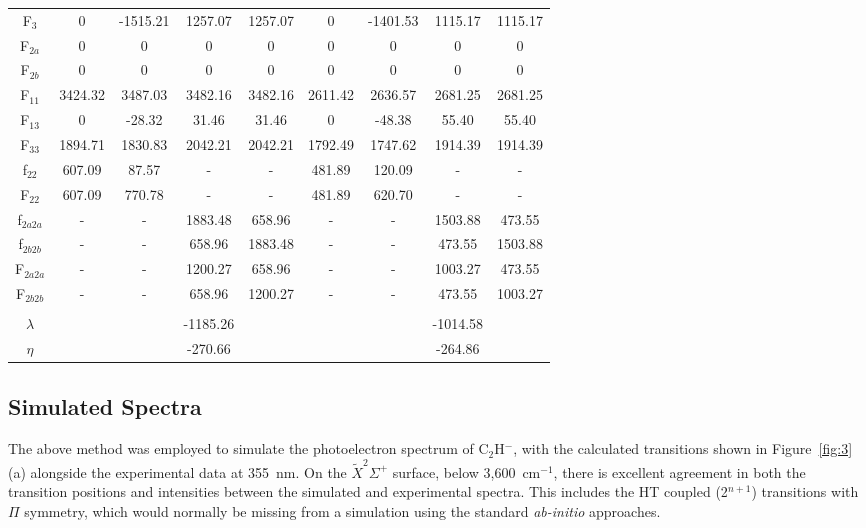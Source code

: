 \documentclass[journal=jpcafh,manuscript=article,layout=onecolumn, 12pt]{achemso}
\begin{document}
\begin{table}
\begin{tabular}{c | c c c c | c c c c}
     	F$_3$ &  0& -1515.21&  1257.07& 1257.07& 0& -1401.53& 1115.17& 1115.17\\
     	F$_{2a}$& 0 & 0& 0& 0& 0& 0& 0&0 \\
     	F$_{2b}$&  0& 0& 0& 0& 0& 0& 0&0 \\
     	F$_{11}$& 3424.32 &  3487.03& 3482.16& 3482.16& 2611.42&  2636.57& 2681.25& 2681.25\\
     	F$_{13}$&  0 & -28.32& 31.46& 31.46& 0& -48.38& 55.40& 55.40\\
     	F$_{33}$& 1894.71 & 1830.83& 2042.21& 2042.21& 1792.49&  1747.62& 1914.39& 1914.39\\
     	f$_{22}$& 607.09&  87.57& -& -& 481.89&  120.09& -& -\\
     	F$_{22}$& 607.09 & 770.78& -& -& 481.89& 620.70& -& -\\
     	f$_{2a2a}$& - &- & 1883.48& 658.96& -& -& 1503.88& 473.55\\
     	f$_{2b2b}$& - &- & 658.96& 1883.48& -& -& 473.55& 1503.88\\
     	F$_{2a2a}$& -& -& 1200.27& 658.96& -& -& 1003.27& 473.55\\
     	F$_{2b2b}$& -& -& 658.96& 1200.27& -& -& 473.55& 1003.27\\
     	&&&&&&&& \\
     	$\lambda$& & & -1185.26& & & & -1014.58& \\
     	$\eta$ & & & -270.66& & & & -264.86& \\
     	
     \end{tabular}
\end{table}

\subsection{Simulated Spectra}
The above method was employed to simulate the photoelectron spectrum of C$_2$H$^-$, with the calculated transitions shown in Figure~\ref{fig:3}(a) alongside the experimental data at 355~nm. %
On the $\tilde{X} ^2\Sigma^+$ surface, below 3,600~cm$^{-1}$, there is excellent agreement in both the transition positions and intensities between the simulated and experimental spectra. This includes the HT coupled (2$^{n+1}$) transitions with $\Pi$ symmetry, which would normally be missing from a simulation using the standard \emph{ab-initio} approaches. 
\end{document}
